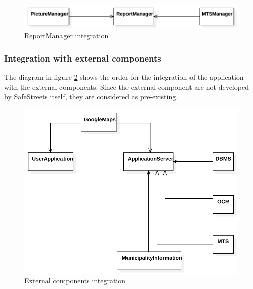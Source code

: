 \documentclass[./main.tex]{subfiles}
\begin{document}
\begin{figure}[H]
\centering
\includegraphics[width=\textwidth]{resources/integration_diagrams/integration_report_manager}
\caption{ReportManager integration}
\label{fig:integration_report_manager}
\end{figure}

\subsubsection{Integration with external components}

The diagram in figure \ref{fig:integration_client_server} shows the order for
the integration of the application with the external components. Since the
external component are not developed by SafeStreets itself, they are considered
as pre-existing.

\begin{figure}[H]
\centering
\includegraphics[width=\textwidth]{resources/integration_diagrams/integration_client_server}
\caption{External components integration}
\label{fig:integration_client_server}
\end{figure}
\end{document}

